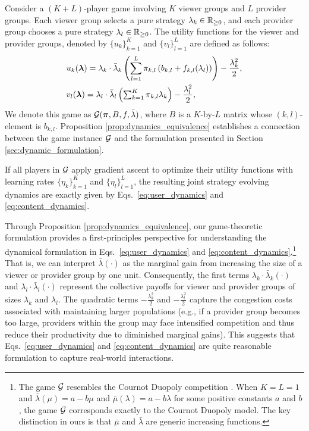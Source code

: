 Consider a $(K+L)$-player game involving $K$ viewer groups and $L$ provider groups. Each viewer group selects a pure strategy $\lambda_k \in \mathbb{R}_{\geq 0}$, and each provider group chooses a pure strategy $\lambda_l \in \mathbb{R}_{\geq 0}$. The utility functions for the viewer and provider groups, denoted by $\{u_k\}_{k=1}^K$ and $\{v_l\}_{l=1}^L$ are defined as follows:
\begin{align}\label{eq:util_user}
    & u_k(\bm{\lambda})= \lambda_k \cdot \bar{\lambda}_k \left(\sum_{l=1}^L \pi_{k,l}\left(b_{k,l}+f_{k,l}(\lambda_l)\right)\right)-\frac{\lambda_k^2}{2}, \\ \label{eq:util_creator}
    & v_l(\bm{\lambda})= \lambda_l\cdot \bar{\lambda}_l \left(\textstyle\sum_{k=1}^K \pi_{k,l}\lambda_k\right)-\frac{\lambda_l^2}{2},
\end{align}
We denote this game as $\mathcal{G}(\bm{\pi}, B, f, \bar{\lambda})$, where $B$ is a $K$-by-$L$ matrix whose $(k,l)$-element is $b_{k,l}$. Proposition \ref{prop:dynamics_equivalence} establishes a connection between the game instance $\mathcal{G}$ and the 
formulation presented in Section \ref{sec:dynamic_formulation}.

\begin{proposition}\label{prop:dynamics_equivalence}
    If all players in $\mathcal{G}$ apply gradient ascent to optimize their utility functions with learning rates $\{\eta_k\}_{k=1}^K$ and $\{\eta_l\}_{l=1}^L$, the resulting joint strategy evolving dynamics are exactly given by Eqs.~\eqref{eq:user_dynamics} and \eqref{eq:content_dynamics}.
\end{proposition}

Through Proposition \ref{prop:dynamics_equivalence}, our game-theoretic formulation provides a first-principles perspective for understanding the dynamical formulation in Eqs.~\eqref{eq:user_dynamics} and \eqref{eq:content_dynamics}.\footnote{The game $\mathcal{G}$ resembles the Cournot Duopoly competition \cite{cournot1838recherches}. When $K = L = 1$ and $\bar{\lambda}(\mu) = a - b\mu$ and $\bar{\mu}(\lambda) = a - b\lambda$ for some positive constants $a$ and $b$, the game $\mathcal{G}$ corresponds exactly to the Cournot Duopoly model. The key distinction in ours is that $\bar{\mu}$ and $\bar{\lambda}$ are generic increasing functions.} 
That is, 
we can interpret $\bar{\lambda}(\cdot)$ as the marginal gain from increasing the size of a viewer or provider group by one unit. Consequently, the first terms $\lambda_k \cdot \bar{\lambda}_k(\cdot)$ and $\lambda_l \cdot \bar{\lambda}_l(\cdot)$ represent the collective payoffs for viewer and provider groups of sizes $\lambda_k$ and $\lambda_l$. 
The quadratic terms $-\frac{\lambda_k^2}{2}$ and $-\frac{\lambda_l^2}{2}$ capture the congestion costs associated with maintaining larger populations (e.g., if a provider group becomes too large, providers within the group may face intensified competition and thus reduce their productivity due to diminished marginal gains). This suggests that Eqs.~\eqref{eq:user_dynamics} and \eqref{eq:content_dynamics} are quite reasonable formulation to capture real-world interactions.